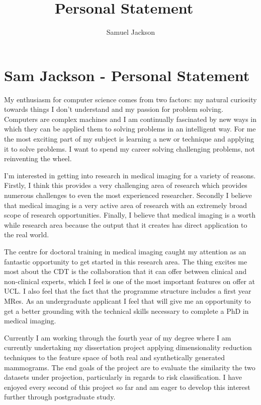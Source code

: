 \documentclass[paper=a4, fontsize=11pt]{scrartcl}	%
\title{
	\vspace{-0.5in} 	\usefont{OT1}{bch}{b}{n}
	 Personal Statement \
}
\author{
	\usefont{OT1}{bch}{m}{n} Samuel Jackson
}
\date{}
\numberwithin{equation}{section}															%
\numberwithin{figure}{section}																%
\numberwithin{table}{section}
\begin{document}
\section*{Sam Jackson - Personal Statement}
My enthusiasm for computer science comes from two factors: my natural curiosity towards things I don't understand and my passion for problem solving. Computers are complex machines and I am continually fascinated by new ways in which they can be applied them to solving problems in an intelligent way. For me the most exciting part of my subject is learning a new or technique and applying it to solve problems. I want to spend my career solving challenging problems, not reinventing the wheel.

I'm interested in getting into research in medical imaging for a variety of reasons. Firstly, I think this provides a very challenging area of research which provides numerous challenges to even the most experienced researcher. Secondly I believe that medical imaging is a very active area of research with an extremely broad scope of research opportunities. Finally, I believe that medical imaging is a worth while research area because the output that it creates has direct application to the real world.

The centre for doctoral training in medical imaging caught my attention as an fantastic opportunity to get started in this research area. The thing excites me most about the CDT is the collaboration that it can offer between clinical and non-clinical experts, which I feel is one of the most important features on offer at UCL. I also feel that the fact that the programme structure includes a first year MRes. As an undergraduate applicant I feel that will give me an opportunity to get a better grounding with the technical skills necessary to complete a PhD in medical imaging.

Currently I am working through the fourth year of my degree where I am currently undertaking my dissertation project applying dimensionality reduction techniques to the feature space of both real and synthetically generated mammograms. The end goals of the project are to evaluate the similarity the two datasets under projection, particularly in regards to risk classification. I have enjoyed every second of this project so far and am eager to develop this interest further through postgraduate study.
\end{document}
